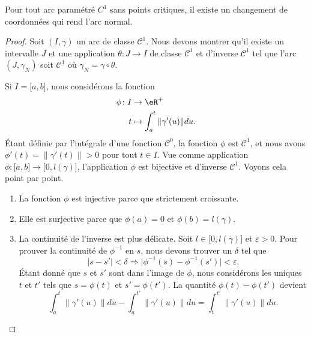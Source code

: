 \begin{proposition}     \label{PropExisteChmNorm}
Pour tout arc paramétré $C^1$ sans points critiques, il existe un changement de coordonnées qui rend l'arc normal.
\end{proposition}

\begin{proof}
Soit $(I,\gamma)$ un arc de classe $\mathcal{C}^1$. Nous devons montrer qu'il existe un intervalle $J$ et une application $\theta\colon J\to I$ de classe $\mathcal{C}^1$ et d'inverse $\mathcal{C}^1$ tel que l'arc $(J,\gamma_N)$ soit $\mathcal{C}^1$ où $\gamma_N=\gamma\circ\theta$.

Si $I=\mathopen[ a ,b \mathclose]$, nous considérons la fonction
\begin{equation}        \label{EqDevVarPhi}
    \begin{aligned}
        \phi\colon I&\to \eR^+ \\
        t&\mapsto \int_a^t\| \gamma'(u) \|du.
    \end{aligned}
\end{equation}
Étant définie par l'intégrale d'une fonction $\mathcal{C}^0$, la fonction $\phi$ est $\mathcal{C}^1$, et nous avons $\phi'(t)=\| \gamma'(t) \|>0$ pour tout $t\in I$. Vue comme application $\phi\colon \mathopen[ a , b \mathclose]\to \mathopen[ 0 , l(\gamma) \mathclose]$, l'application $\phi$ est bijective et d'inverse $\mathcal{C}^1$. Voyons cela point par point.
\begin{enumerate}
    \item
        La fonction $\phi$ est injective parce que strictement croissante.
    \item
        Elle est surjective parce que $\phi(a)=0$ et $\phi(b)=l(\gamma)$.
    \item
        La continuité de l'inverse est plus délicate. Soit $l\in\mathopen[ 0 , l(\gamma) \mathclose]$ et $\varepsilon>0$. Pour prouver la continuité de $\phi^{-1}$ en $s$, nous devons trouver un $\delta$ tel que
        \begin{equation}
            | s-s' |<\delta\Rightarrow\big| \phi^{-1}(s)-\phi^{-1}(s') \big|<\varepsilon.
        \end{equation}
        Étant donné que $s$ et $s'$ sont dans l'image de $\phi$, nous considérons les uniques $t$ et $t'$ tels que $s=\phi(t)$ et $s'=\phi(t')$. La quantité $\phi(t)-\phi(t')$ devient
        \begin{equation}        \label{EqCondvpemuCont}
            \int_a^t\big\| \gamma'(u) \big\|du-\int_a^{t'}\big\| \gamma'(u) \big\|du=\int_{t}^{t'}\big\| \gamma'(u) \big\|du.

\end{equation}
\end{enumerate}
\end{proof}
